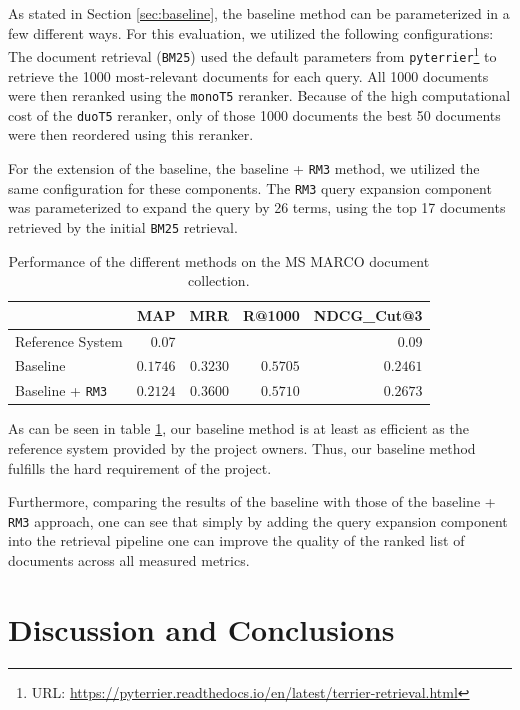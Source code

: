 \documentclass[sigconf]{acmart}
\begin{document}
As stated in Section \ref{sec:baseline}, the baseline method can be parameterized in a few different ways. For this evaluation, we utilized the following configurations: The document retrieval (\texttt{BM25}) used the default parameters from \texttt{pyterrier}\footnote{URL: \url{https://pyterrier.readthedocs.io/en/latest/terrier-retrieval.html}} to retrieve the 1000 most-relevant documents for each query. All 1000 documents were then reranked using the \texttt{monoT5} reranker. Because of the high computational cost of the \texttt{duoT5} reranker, only of those 1000 documents the best 50 documents were then reordered using this reranker.

For the extension of the baseline, the baseline + \texttt{RM3} method, we utilized the same configuration for these components. The \texttt{RM3} query expansion component was parameterized to expand the query by 26 terms, using the top 17 documents retrieved by the initial \texttt{BM25} retrieval.

\begin{table}[h]
\begin{center}
	\caption{Performance of the different methods on the MS MARCO document collection.}
	\begin{tabular}{l|rrrr}
			& MAP & MRR & R@1000 & NDCG\_Cut@3 \\
		\hline
		Reference System & 0.07 &  &  & 0.09 \\
		Baseline & $0.1746$ & $0.3230$ & $0.5705$ & $0.2461$ \\
		Baseline + \texttt{RM3} & $\mathbf{0.2124}$ & $\mathbf{0.3600}$ & $\mathbf{0.5710}$ & $\mathbf{0.2673}$
	\end{tabular}
	\label{table:1}
\end{center}
\end{table}

As can be seen in table \ref{table:1}, our baseline method is at least as efficient as the reference system provided by the project owners. Thus, our baseline method fulfills the hard requirement of the project.

Furthermore, comparing the results of the baseline with those of the baseline + \texttt{RM3} approach, one can see that simply by adding the query expansion component into the retrieval pipeline one can improve the quality of the ranked list of documents across all measured metrics.

\section{Discussion and Conclusions}
\end{document}
